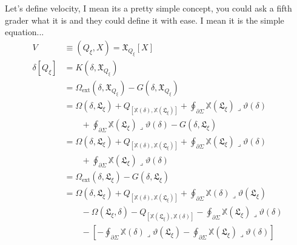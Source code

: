 Let's define velocity, I mean its a pretty simple concept, you could ask a fifth grader what it is and they could define it with ease. I mean it is the simple equation...
\[
	\begin{aligned}
		V
		 & \equiv
		(Q_{\xi},X)
		=
		\mathfrak{X}_{Q_{\xi}}[X]
		\\[1ex]
		\delta[Q_{\xi}]
		 & =
		K(\delta,\mathfrak{X}_{Q_{\xi}})
		\\
		 & =
		\Omega_{\mathrm{ext}}(\delta,\mathfrak{X}_{Q_{\xi}})
		-
		G(\delta,\mathfrak{X}_{Q_{\xi}})
		\\[2ex]
		 & =
		\Omega(\delta,\mathfrak{L}_{\xi})
		+
		Q_{[\mathbb{X}(\delta),\mathbb{X}(\mathfrak{L}_{\xi})]}
		+
		\oint_{\partial\Sigma}
		\mathbb{X}(\mathfrak{L}_{\xi})
		\mathbin{\lrcorner}
		\vartheta(\delta)
		\\
		 & \qquad
		+
		\oint_{\partial\Sigma}
		\mathbb{X}(\mathfrak{L}_{\xi})
		\mathbin{\lrcorner}
		\vartheta(\delta)
		-
		G(\delta,\mathfrak{L}_{\xi})
		\\[2ex]
		 & =
		\Omega(\delta,\mathfrak{L}_{\xi})
		+
		Q_{[\mathbb{X}(\delta),\mathbb{X}(\mathfrak{L}_{\xi})]}
		+
		\oint_{\partial\Sigma}
		\mathbb{X}(\mathfrak{L}_{\xi})
		\mathbin{\lrcorner}
		\vartheta(\delta)
		\\
		 & \qquad
		+
		\oint_{\partial\Sigma}
		\mathbb{X}(\mathfrak{L}_{\xi})
		\mathbin{\lrcorner}
		\vartheta(\delta)
		\\[2ex]
		 & =
		\Omega_{\mathrm{ext}}(\delta,\mathfrak{L}_{\xi})
		-
		G(\delta,\mathfrak{L}_{\xi})
		\\[2ex]
		 & =
		\Omega(\delta,\mathfrak{L}_{\xi})
		+
		Q_{[\mathbb{X}(\delta),\mathbb{X}(\mathfrak{L}_{\xi})]}
		+
		\oint_{\partial\Sigma}
		\mathbb{X}(\delta)
		\mathbin{\lrcorner}
		\vartheta(\mathfrak{L}_{\xi})
		\\
		 & \qquad
		-
		\Omega(\mathfrak{L}_{\xi},\delta)
		-
		Q_{[\mathbb{X}(\mathfrak{L}_{\xi}),\mathbb{X}(\delta)]}
		-
		\oint_{\partial\Sigma}
		\mathbb{X}(\mathfrak{L}_{\xi})
		\mathbin{\lrcorner}
		\vartheta(\delta)
		\\
		 & \qquad
		-
		\left[
			-\oint_{\partial\Sigma}
			\mathbb{X}(\delta)
			\mathbin{\lrcorner}
			\vartheta(\mathfrak{L}_{\xi})
			-
			\oint_{\partial\Sigma}
			\mathbb{X}(\mathfrak{L}_{\xi})
			\mathbin{\lrcorner}
			\vartheta(\delta)
			\right]
		\\[2ex]
	\end{aligned}
\]
